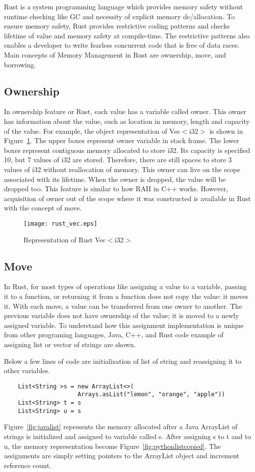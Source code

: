 
Rust is a system programming language which provides memory safety without runtime checking like GC and necessity of explicit memory de/allocation. 
To ensure memory safety, Rust provides restrictive coding patterns and checks lifetime of value and memory safety at compile-time.
The restrictive patterns also enables a developer to write fearless concurrent code that is free of data races.
Main concepts of Memory Management in Rust are ownership, move, and borrowing.

\subsection{Ownership}
In ownership feature or Rust, each value has a variable called owner.
This owner has information about the value, such as location in memory, length and capacity of the value. 
For example, the object representation of Vec$<$i32$>$ is shown in Figure~\ref{fig:rustvec}. The upper boxes represent owner variable in stack frame. 
The lower boxes represent contiguous memory allocated to store i32. Its capacity is specified 10, but 7 values of i32 are stored. 
Therefore, there are still spaces to store 3 values of i32 without reallocation of memory. This owner can live on the scope associated with its lifetime.
When the owner is dropped, the value will be dropped too. This feature is similar to how RAII in C++ works. 
However, acquisition of owner out of the scope where it was constructed is available in Rust with the concept of move. 

\begin{figure}[htb]
    \texttt{[image: rust\_vec.eps]}
    \caption{Representation of Rust Vec$<$i32$>$}
    \label{fig:rustvec}
\end{figure}


\subsection{Move}
In Rust, for most types of operations like assigning a value to a variable, passing it to a function, or returning it from a function does not copy the value: it moves it. 
With each move, a value can be transferred from one owner to another. The previous variable does not have ownership of the value; it is moved to a newly assigned variable. 
To understand how this assignment implementation is unique from other programing languages, Java, C++, and Rust code example of assigning list or vector of strings are shown.

Below a few lines of code are initialization of list of string and reassigning it to other variables. 
\begin{lstlisting}
    List<String >s = new ArrayList<>(
                     Arrays.asList("lemon", "orange", "apple"))
    List<String> t = s
    List<String> u = s
 \end{lstlisting}
Figure~\ref{fig:javalist} represents the memory allocated after a Java ArrayList of strings is initialized and assigned to variable called s. After assigning s to t and to u, 
the memory representation become Figure~\ref{fig:pythonlistcopied}. The assignments are simply setting pointers to the ArrayList object and increment reference count. 


